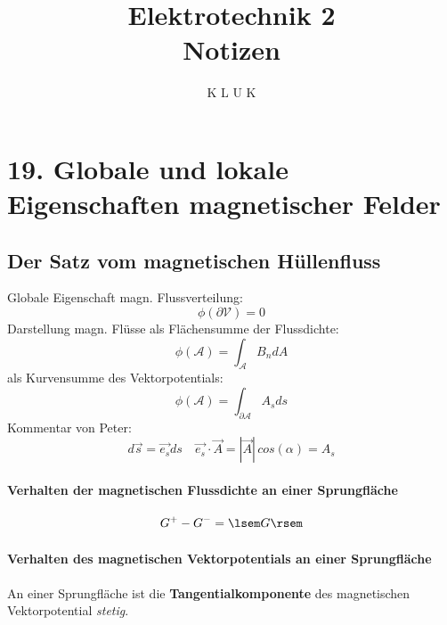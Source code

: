 \documentclass[12pt]{article}
\title{Elektrotechnik 2 \\ Notizen }
\author{K L U K}
\begin{document}
\maketitle 
\newpage
\section{19. Globale und lokale Eigenschaften magnetischer Felder}
\subsection{Der Satz vom magnetischen Hüllenfluss}
Globale Eigenschaft magn. Flussverteilung:
\begin{equation}\label{key}
\phi(\partial \mathcal{V}) = 0
\end{equation}
Darstellung magn. Flüsse als Flächensumme der Flussdichte: 
\begin{equation}\label{key}
\phi(\mathcal{A}) = \int_{\mathcal{A}} B_n dA
\end{equation}
als Kurvensumme des Vektorpotentials: 
\begin{equation}\label{key}
\phi(\mathcal{A})=\int_{\partial \mathcal{A}} A_s ds
\end{equation}
Kommentar von Peter: 
\begin{equation}\label{key}
d\vec{s} = \vec{e_s} ds  \quad \vec{e_s}\cdot \vec{A} = |\vec{A}|\, cos(\alpha) = A_s 
\end{equation}
\paragraph{Verhalten der magnetischen Flussdichte an einer Sprungfläche}

\begin{equation}\label{key}
G^+-G^-=\lsem G \rsem
\end{equation}
\paragraph{Verhalten des magnetischen Vektorpotentials an einer Sprungfläche} %
An einer Sprungfläche ist die \textbf{Tangentialkomponente } des magnetischen Vektorpotential \textit{stetig}. 
\end{document}
